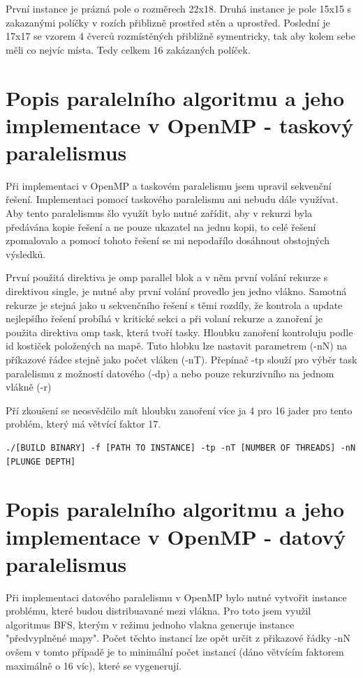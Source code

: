 \documentclass[epsf,epic,eepic,eepicemu]{article}
\begin{document}
První instance je prázná pole o rozměrech 22x18. Druhá instance je pole 15x15 s zakazanými políčky v rozích přiblizně prostřed stěn a uprostřed. Poslední je 17x17 se vzorem 4 čverců rozmístěných přibližně symentricky, tak aby kolem sebe měli co nejvíc místa. Tedy celkem 16 zakázaných políček.
\section{Popis paralelního algoritmu a jeho implementace v OpenMP - taskový paralelismus}
Při implementaci v OpenMP a taskovém paralelismu jsem upravil sekvenční řešení. Implementaci pomocí taskového paralelismu ani nebudu dále využívat. Aby tento paralelismus šlo využít bylo nutné zařídit, aby v rekurzi byla předávána kopie řešení a ne pouze ukazatel na jednu kopii, to celé řešení zpomalovalo a pomocí tohoto řešení se mi nepodařílo dosáhnout obstojných výsledků. 

První použitá direktiva je omp parallel blok a v něm první volání rekurze s direktivou single, je nutné aby první volání provedlo jen jedno vlákno. Samotná rekurze je stejná jako u sekvenčního řešení s těmi rozdíly, že kontrola a update nejlepšího řešení probíhá v kritické sekci a při volaní rekurze a zanoření je použita direktiva omp task, která tvoří tasky. Hloubku zanoření kontroluju podle id kostiček položených na mapě. Tuto hlobku lze nastavit parametrem (-nN) na příkazové řádce stejně jako počet vláken (-nT). Přepínač -tp slouží pro výběr task paralelismu z možností datového (-dp) a nebo pouze rekurzivního na jednom vlákně (-r)

Pří zkoušení se neosvědčilo mít hloubku zanoření více ja 4 pro 16 jader pro tento problém, který má větvící faktor 17.

\begin{verbatim}
./[BUILD BINARY] -f [PATH TO INSTANCE] -tp -nT [NUMBER OF THREADS] -nN [PLUNGE DEPTH]
\end{verbatim}


\section{Popis paralelního algoritmu a jeho implementace v OpenMP - datový paralelismus}\label{kap1}

Při implementaci datového paralelismu v OpenMP bylo nutné vytvořit instance problému, které budou distribuavané mezi vlákna. Pro toto jsem využil algoritmus BFS, kterým v režimu jednoho vlakna generuje instance "předvyplněné mapy". Počet těchto instancí lze opět určit z přikazové řádky -nN ovšem v tomto případě je to minimální počet instancí (dáno větvícím faktorem maximálně o 16 víc), které se vygenerují. 
\end{document}
